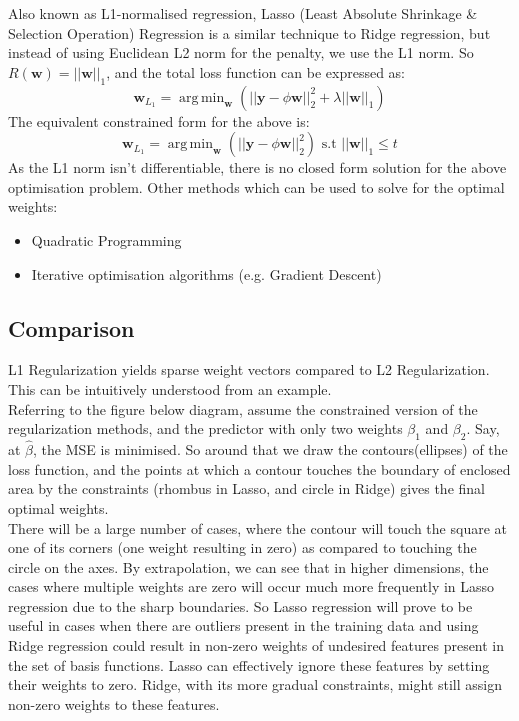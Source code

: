 \documentclass{report}
\newcommand{\w}{\mathbf{w}} %
\newcommand{\y}{\mathbf{y}}
\DeclareMathOperator*{\argmin}{arg\,min}
\begin{document}
Also known as L1-normalised regression, Lasso (Least Absolute Shrinkage \& Selection Operation) Regression is a similar technique to Ridge regression, but instead of using Euclidean L2 norm for the penalty, we use the L1 norm. So $R(\w) = ||\w||_1$, and the total loss function can be expressed as:
\begin{equation*}
  \w_{L_1} = \argmin_\w (||\y-\phi \w||_2^2 + \lambda||\w||_1)
\end{equation*}
The equivalent constrained form for the above is:
\begin{equation*}
  \w_{L_1} = \argmin_\w (||\y-\phi \w||_2^2) \text{ s.t } ||\w||_1 \leq t
\end{equation*}
As the L1 norm isn't differentiable, there is no closed form solution for the above optimisation problem. Other methods which can be used to solve for the optimal weights:
\begin{itemize}
  \item Quadratic Programming
  \item Iterative optimisation algorithms (e.g. Gradient Descent)
\end{itemize}

\subsection{Comparison}

L1 Regularization yields sparse weight vectors compared to L2 Regularization. This can be intuitively understood from an example. \\

Referring to the figure below diagram, assume the constrained version of the regularization methods, and the predictor with only two weights $\beta_1$ and $\beta_2$. Say, at $\hat{\beta}$, the MSE is minimised. So around that we draw the contours(ellipses) of the loss function, and the points at which a contour touches the boundary of enclosed area by the constraints (rhombus in Lasso, and circle in Ridge) gives the final optimal weights.\\

There will be a large number of cases, where the contour will touch the square at one of its corners (one weight resulting in zero) as compared to touching the circle on the axes. By extrapolation, we can see that in higher dimensions, the cases where multiple weights are zero will occur much more frequently in Lasso regression due to the sharp boundaries. So Lasso regression will prove to be useful in cases when there are outliers present in the training data and using Ridge regression could result in non-zero weights of undesired features present in the set of basis functions. Lasso can effectively ignore these features by setting their weights to zero. Ridge, with its more gradual constraints, might still assign non-zero weights to these features. \\
\end{document}
